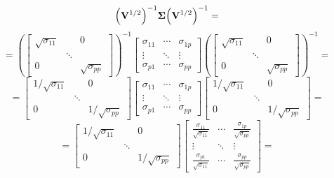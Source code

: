         \[
            {\left(\bold{V}^{1/2}\right)}^{-1}\bold{\Sigma}{\left(\bold{V}^{1/2}\right)}^{-1}
            =
        \]
        \[
            =
            {\left(
                \begin{bmatrix}
                    \sqrt{\sigma_{11}} & & 0 \\
                    & \ddots & \\
                    0 & & \sqrt{\sigma_{pp}}
                \end{bmatrix}
            \right)}^{-1}
            \begin{bmatrix}
                \sigma_{11} & \cdots & \sigma_{1p} \\
                \vdots & \ddots & \vdots \\
                \sigma_{p1} & \cdots & \sigma_{pp}
            \end{bmatrix}
            {\left(
                \begin{bmatrix}
                    \sqrt{\sigma_{11}} & & 0 \\
                    & \ddots & \\
                    0 & & \sqrt{\sigma_{pp}}
                \end{bmatrix}
            \right)}^{-1}
            =
        \]
        \[
            =
            \begin{bmatrix}
                1/\sqrt{\sigma_{11}} & & 0 \\
                & \ddots & \\
                0 & & 1/\sqrt{\sigma_{pp}}
            \end{bmatrix}
            \begin{bmatrix}
                \sigma_{11} & \cdots & \sigma_{1p} \\
                \vdots & \ddots & \vdots \\
                \sigma_{p1} & \cdots & \sigma_{pp}
            \end{bmatrix}
            \begin{bmatrix}
                1/\sqrt{\sigma_{11}} & & 0 \\
                & \ddots & \\
                0 & & 1/\sqrt{\sigma_{pp}}
            \end{bmatrix}
            =
        \]
        \[
            =
            \begin{bmatrix}
                1/\sqrt{\sigma_{11}} & & 0 \\
                & \ddots & \\
                0 & & 1/\sqrt{\sigma_{pp}}
            \end{bmatrix}
            \begin{bmatrix}
                \frac{\sigma_{11}}{\sqrt{\sigma_{11}}} & \cdots & \frac{\sigma_{1p}}{\sqrt{\sigma_{pp}}} \\
                \vdots & \ddots & \vdots \\
                \frac{\sigma_{p1}}{\sqrt{\sigma_{11}}} & \cdots & \frac{\sigma_{pp}}{\sqrt{\sigma_{pp}}}
            \end{bmatrix}
            =
        \]
